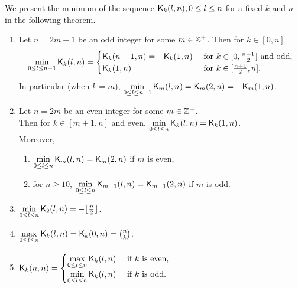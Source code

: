 \documentclass{llncs}
\begin{document}
We present the minimum of the sequence $\mathsf{K}_{k}(l,n), 0 \leq l \leq n$ for a fixed $k$ and $n$ in the following theorem.
\begin{theorem}\label{thm:minK}
\begin{enumerate}
\item\label{itm:odd} Let $n = 2m+1$ be an odd integer for some $m \in \mathbb{Z}^+$. Then for $k \in [0,n]$ 
$$\min\limits_{0 \leq l \leq n-1 }\mathsf{K}_{k}(l,n) = 
\begin{cases}
\mathsf{K}_{k}(n-1,n) = -\mathsf{K}_{k}(1,n) & \text{ for  } k \in [0,\frac{n-1}{2}] \text{ and odd}, \\
\mathsf{K}_{k}(1,n) & \text{ for }    k \in [\frac{n+1}{2}, n].
\end{cases}$$
In particular (when $k = m$), $\min\limits_{0 \leq l \leq n-1 }\mathsf{K}_{m}(l,n) = \mathsf{K}_{m}(2,n) = -\mathsf{K}_{m}(1,n)$.

\item\label{itm:even} Let $n = 2m$ be an even integer for some $m \in \mathbb{Z}^+$.\\ Then for $k \in [m+1, n]$ and even,
$\min\limits_{0 \leq l \leq n }\mathsf{K}_{k}(l,n)= \mathsf{K}_{k}(1,n)$.\\
Moreover,
\begin{enumerate}
\item $\min\limits_{0 \leq l \leq n }\mathsf{K}_{m}(l,n)= \mathsf{K}_{m}(2,n)$ if $m$ is even,
\item  for $n \geq 10$, $\min\limits_{0 \leq l \leq n }\mathsf{K}_{m - 1}(l,n) = \mathsf{K}_{m - 1}(2,n)$ if $m$ is odd.
\end{enumerate}
\item\label{itm:min2} $\min\limits_{0 \leq l \leq n} \mathsf{K}_{2}(l,n) = -\lfloor \frac{n}{2} \rfloor$.
\item\label{itm:maxk} $\max\limits_{0 \leq l \leq n} \mathsf{K}_{k}(l,n) = \mathsf{K}_{k}(0,n) = {n \choose k}$.
\item\label{itm:minmaxn} $\mathsf{K}_{k}(n,n) 
=  \begin{cases}
\max\limits_{0 \leq l \leq n} \mathsf{K}_{k}(l,n) & \text{ if $k$ is even},\\
\min\limits_{0 \leq l \leq n} \mathsf{K}_{k}(l,n) & \text{ if $k$ is odd}.
\end{cases}$
\end{enumerate}
\end{theorem}
\end{document}
